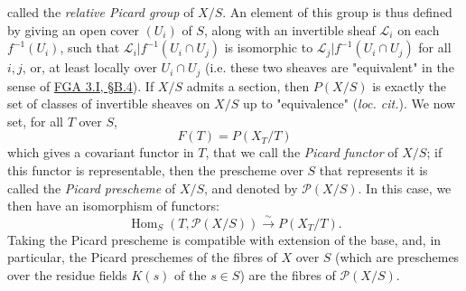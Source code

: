   called the \emph{relative Picard group} of \(X/S\).
  An element of this group is thus defined by giving an open cover \((U_i)\) of \(S\), along with an invertible sheaf \(\mathscr {L}_i\) on each \(f^{-1}(U_i)\), such that \(\mathscr {L}_i|f^{-1}(U_i\cap  U_j)\) is isomorphic to \(\mathscr {L}_j|f^{-1}(U_i\cap  U_j)\) for all \(i,j\), or, at least locally over \(U_i\cap  U_j\) (i.e. these two sheaves are "equivalent" in the sense of \hyperref[fga3.i-b.4]{FGA 3.I, §B.4}).
  If \(X/S\) admits a section, then \(P(X/S)\) is exactly the set of classes of invertible sheaves on \(X/S\) up to "equivalence" (\emph{loc. cit.}).
  We now set, for all \(T\) over \(S\),
  \[     F(T)     = P(X_T/T)   \]
  which gives a covariant functor in \(T\), that we call the \emph{Picard functor} of \(X/S\);
  if this functor is representable, then the prescheme over \(S\) that represents it is called the \emph{Picard prescheme} of \(X/S\), and denoted by \(\mathscr {P}(X/S)\).
  In this case, we then have an isomorphism of functors:
  \[     \operatorname {Hom}_S(T,\mathscr {P}(X/S)) \xrightarrow {\sim } P(X_T/T).   \]
  Taking the Picard prescheme is compatible with extension of the base, and, in particular, the Picard preschemes of the fibres of \(X\) over \(S\) (which are preschemes over the residue fields \(K(s)\) of the \(s\in  S\)) are the fibres of \(\mathscr {P}(X/S)\).
  
